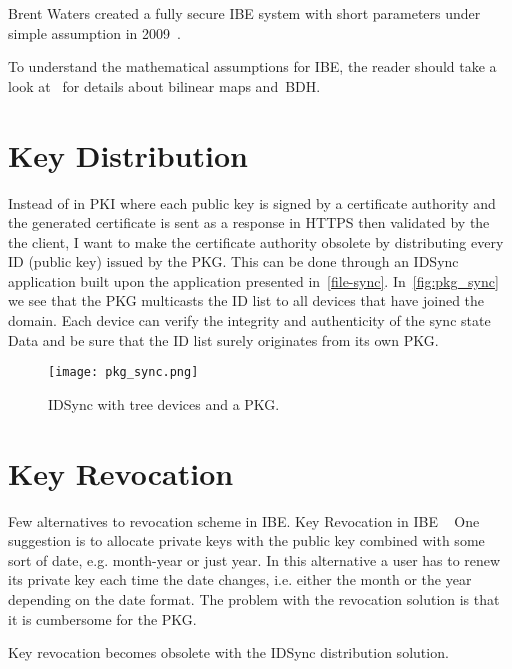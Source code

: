 Brent Waters created a fully secure \gls{IBE} system with short parameters under simple assumption in 2009~\cite{DBLP:conf/crypto/Waters09}.

To understand the mathematical assumptions for \gls{IBE}, the reader should take a look at~\cite[section 3]{DBLP:conf/crypto/BonehF01} for details about bilinear maps and~\gls{BDH}.

\section{Key Distribution}
Instead of in \gls{PKI} where each public key is signed by a certificate authority and the generated certificate is sent as a response in \gls{HTTPS} then validated by the the client, I want to make the certificate authority obsolete by distributing every \gls{ID} (public key) issued by the \gls{PKG}.
This can be done through an IDSync application built upon the application presented in~\autoref{file-sync}.
In~\autoref{fig:pkg_sync} we see that the \gls{PKG} multicasts the \gls{ID} list to all devices that have joined the domain.
Each device can verify the integrity and authenticity of the sync state Data and be sure that the \gls{ID} list surely originates from its own \gls{PKG}.
\begin{figure}[ht]
  \centering
  \texttt{[image: pkg\_sync.png]}
  \caption{IDSync with tree devices and a PKG.}
  \label{fig:pkg_sync}
\end{figure}

\section{Key Revocation}
Few alternatives to revocation scheme in \gls{IBE}.
Key Revocation in IBE ~\cite{DBLP:journals/iacr/BoldyrevaGK12} 
One suggestion is to allocate private keys with the public key combined with some sort of date, e.g. month-year or just year. 
In this alternative a user has to renew its private key each time the date changes, i.e. either the month or the year depending on the date format.
The problem with the revocation solution is that it is cumbersome for the \gls{PKG}.


Key revocation becomes obsolete with the IDSync distribution solution. 
